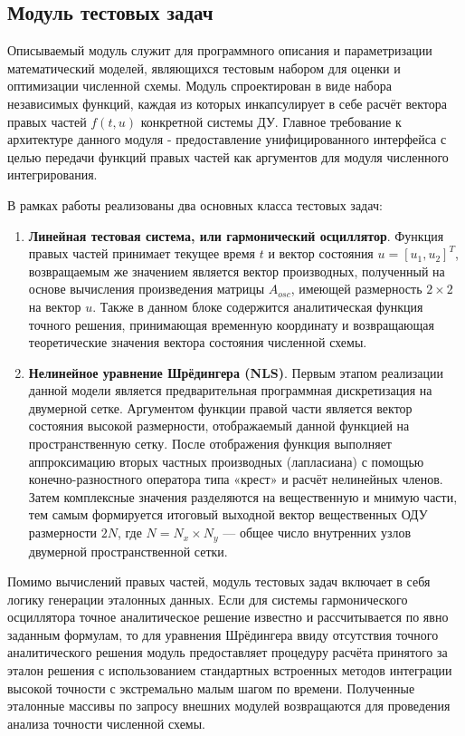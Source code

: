\subsection{Модуль тестовых задач}
Описываемый модуль служит для программного описания и параметризации математический моделей, являющихся тестовым набором для оценки и оптимизации численной схемы. Модуль спроектирован в виде набора независимых функций, каждая из которых инкапсулирует в себе расчёт вектора правых частей $f(t, u)$ конкретной системы ДУ. Главное требование к архитектуре данного модуля - предоставление унифицированного интерфейса с целью передачи функций правых частей как аргументов для модуля численного интегрирования.

В рамках работы реализованы два основных класса тестовых задач:
\begin{enumerate}
	\item \textbf{Линейная тестовая система, или гармонический осциллятор}. Функция правых частей принимает текущее время $t$ и вектор состояния $u = [u_1, u_2]^T$, возвращаемым же значением является вектор производных, полученный на основе вычисления произведения матрицы $A_{osc}$, имеющей размерность $2 \times 2$ на вектор $u$. Также в данном блоке содержится аналитическая функция точного решения, принимающая временную координату и возвращающая теоретические значения вектора состояния численной схемы.
	\item \textbf{Нелинейное уравнение Шрёдингера (NLS)}. Первым этапом реализации данной модели является предварительная программная дискретизация на двумерной сетке. Аргументом функции правой части является вектор состояния высокой размерности, отображаемый данной функцией на пространственную сетку. После отображения функция выполняет аппроксимацию вторых частных производных (лапласиана) с помощью конечно-разностного оператора типа «крест» и расчёт нелинейных членов. Затем комплексные значения разделяются на вещественную и мнимую части, тем самым формируется итоговый выходной вектор вещественных ОДУ размерности $2N$, где $N = N_x \times N_y$ — общее число внутренних узлов двумерной пространственной сетки.
\end{enumerate}
Помимо вычислений правых частей, модуль тестовых задач включает в себя логику генерации эталонных данных. Если для системы гармонического осциллятора точное аналитическое решение известно и рассчитывается по явно заданным формулам, то для уравнения Шрёдингера ввиду отсутствия точного аналитического решения модуль предоставляет процедуру расчёта принятого за эталон решения с использованием стандартных встроенных методов интеграции высокой точности с экстремально малым шагом по времени. Полученные эталонные массивы по запросу внешних модулей возвращаются для проведения анализа точности численной схемы.

